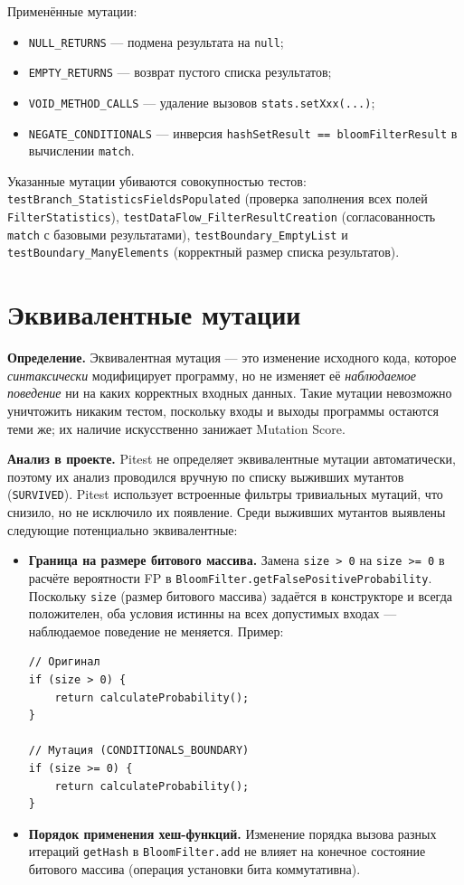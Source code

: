 Применённые мутации:
\begin{itemize}
    \item \texttt{NULL\_RETURNS} --- подмена результата на \texttt{null};
    \item \texttt{EMPTY\_RETURNS} --- возврат пустого списка результатов;
    \item \texttt{VOID\_METHOD\_CALLS} --- удаление вызовов \texttt{stats.setXxx(...)};
    \item \texttt{NEGATE\_CONDITIONALS} --- инверсия \texttt{hashSetResult == bloomFilterResult} в вычислении \texttt{match}.
\end{itemize}

Указанные мутации убиваются совокупностью тестов: \texttt{testBranch\_Statistics\-Fields\-Populated} (проверка заполнения всех полей \texttt{FilterStatistics}), \texttt{testDataFlow\_FilterResult\-Creation} (согласованность \texttt{match} с базовыми результатами), \texttt{testBoundary\_EmptyList} и \texttt{testBoundary\_Many\-Elements} (корректный размер списка результатов).

\section{Эквивалентные мутации} \label{ch4:sec3}

\textbf{Определение.} Эквивалентная мутация --- это изменение исходного кода, которое \emph{синтаксически} модифицирует программу, но не изменяет её \emph{наблюдаемое поведение} ни на каких корректных входных данных. Такие мутации невозможно уничтожить никаким тестом, поскольку входы и выходы программы остаются теми же; их наличие искусственно занижает Mutation Score.

\textbf{Анализ в проекте.} Pitest не определяет эквивалентные мутации автоматически, поэтому их анализ проводился вручную по списку выживших мутантов (\texttt{SURVIVED}). Pitest использует встроенные фильтры тривиальных мутаций, что снизило, но не исключило их появление. Среди выживших мутантов выявлены следующие потенциально эквивалентные:
\begin{itemize}
    \item \textbf{Граница на размере битового массива.} Замена \texttt{size > 0} на \texttt{size >= 0} в расчёте вероятности FP в \texttt{BloomFilter.getFalsePositiveProbability}. Поскольку \texttt{size} (размер битового массива) задаётся в конструкторе и всегда положителен, оба условия истинны на всех допустимых входах --- наблюдаемое поведение не меняется. Пример:
\begin{verbatim}
// Оригинал
if (size > 0) {
    return calculateProbability();
}

// Мутация (CONDITIONALS_BOUNDARY)
if (size >= 0) {
    return calculateProbability();
}
\end{verbatim}
    \item \textbf{Порядок применения хеш-функций.} Изменение порядка вызова разных итераций \texttt{getHash} в \texttt{BloomFilter.add} не влияет на конечное состояние битового массива (операция установки бита коммутативна).
\end{itemize}

